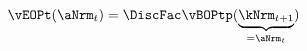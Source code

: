   \begin{equation}\begin{gathered}\begin{aligned}
\vEOPt(\aNrm_{t}) & = \DiscFac \vBOPtp(\underbrace{\kNrm_{t+1}}_{=\aNrm_{t}}) \label{eq:vEOPt}
      \end{aligned}\end{gathered}\end{equation}
